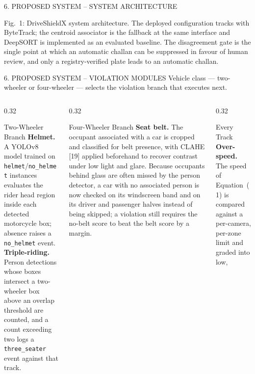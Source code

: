 \documentclass[aspectratio=169,10pt,t]{beamer}
\begin{document}
\begin{frame}[t]{6. PROPOSED SYSTEM -- SYSTEM ARCHITECTURE}
\vspace{0.1em}
{\centering\tiny Fig.~1: DriveShieldX system architecture. The deployed configuration tracks with ByteTrack; the centroid
associator is the fallback at the same interface and DeepSORT is implemented as an evaluated baseline. The disagreement
gate is the single point at which an automatic challan can be suppressed in favour of human review, and only a
registry-verified plate leads to an automatic challan.\par}
\end{frame}

\begin{frame}{6. PROPOSED SYSTEM -- VIOLATION MODULES}
\scriptsize
Vehicle class --- two-wheeler or four-wheeler --- selects the violation branch that executes next.
\vspace{0.4em}
\begin{columns}[T,onlytextwidth]
\begin{column}{0.32\textwidth}
\begin{block}{Two-Wheeler Branch}
\textbf{Helmet.} A YOLOv8 model trained on \texttt{helmet}/\texttt{no\_helmet} instances evaluates the rider head
region inside each detected motorcycle box; absence raises a \texttt{no\_helmet} event.\\[0.4em]
\textbf{Triple-riding.} Person detections whose boxes intersect a two-wheeler box above an overlap threshold are
counted, and a count exceeding two logs a \texttt{three\_seater} event against that track.
\end{block}
\end{column}
\begin{column}{0.32\textwidth}
\begin{block}{Four-Wheeler Branch}
\textbf{Seat belt.} The occupant associated with a car is cropped and classified for belt presence, with CLAHE [19]
applied beforehand to recover contrast under low light and glare. Because occupants behind glass are often missed by
the person detector, a car with no associated person is now checked on its windscreen band and on its driver and
passenger halves instead of being skipped; a violation still requires the no-belt score to beat the belt score by a
margin.
\end{block}
\end{column}
\begin{column}{0.32\textwidth}
\begin{block}{Every Track}
\textbf{Over-speed.} The speed of Equation~(1) is compared against a per-camera, per-zone limit and graded into low,

\end{block}
\end{column}
\end{columns}
\end{frame}
\end{document}
